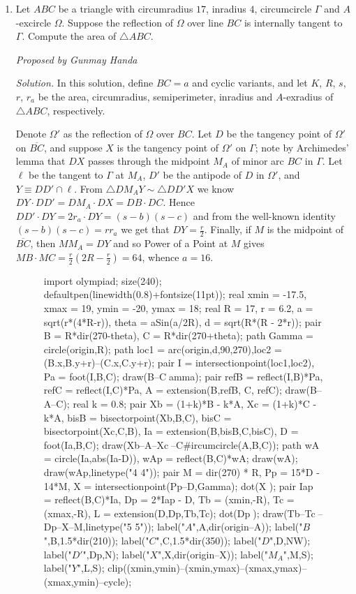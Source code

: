 \documentclass[10pt]{article}
\newcommand{\proposed}[1]
{
\vspace{5pt}
\noindent\textit{Proposed by #1}
}
\newcommand{\solution}
{
\vspace{5pt}
\noindent\textit{Solution.}\qquad
}
\begin{document}
\begin{enumerate}
\item Let $ABC$ be a triangle with circumradius $17$, inradius $4$, circumcircle $\Gamma$ and $A$-excircle $\Omega$. Suppose the reflection of $\Omega$ over line $BC$ is internally tangent to $\Gamma$.  Compute the area of $\triangle ABC$.

\proposed{Gunmay Handa}

\solution In this solution, define $BC=a$ and cyclic variants, and let $K$, $R$, $s$, $r$, $r_a$ be the area, circumradius, semiperimeter, inradius and $A$-exradius of $\triangle ABC$, respectively. 

\par Denote $\Omega'$ as the reflection of $\Omega$ over $BC$. Let $D$ be the tangency point of $\Omega'$ on $\overline{BC}$, and suppose $X$ is the tangency point of $\Omega'$ on $\Gamma$; note by Archimedes' lemma that $DX$ passes through the midpoint $M_A$ of minor arc $BC$ in $\Gamma$. Let $\ell$ be the tangent to $\Gamma$ at $M_A$, $D'$ be the antipode of $D$ in $\Omega'$, and $Y\equiv DD'\cap \ell$. From $\triangle DM_AY\sim \triangle DD'X$ we know $DY\cdot DD'=DM_A\cdot DX=DB\cdot DC$. Hence $DD'\cdot DY=2r_a\cdot DY=(s-b)(s-c)$ and from the well-known identity $(s-b)(s-c)=rr_a$ we get that $DY=\frac{r}{2}$. Finally, if $M$ is the midpoint of $\overline{BC}$, then $MM_A=DY$ and so Power of a Point at $M$ gives $MB\cdot MC=\frac{r}{2}\left(2R-\frac{r}{2}\right)=64$, whence $a=16$.

\begin{figure}[ht]
	\centering
	\begin{asy}
	import olympiad;
	size(240);
defaultpen(linewidth(0.8)+fontsize(11pt));
real xmin = -17.5, xmax = 19, ymin = -20, ymax = 18;
real R = 17, r = 6.2, a = sqrt(r*(4*R-r)), theta = aSin(a/2R), d = sqrt(R*(R - 2*r));
pair B = R*dir(270-theta), C = R*dir(270+theta);
path Gamma = circle(origin,R);
path loc1 = arc(origin,d,90,270),loc2 = (B.x,B.y+r)--(C.x,C.y+r);
pair I = intersectionpoint(loc1,loc2), Pa = foot(I,B,C);
draw(B--C^^Gamma);
pair refB = reflect(I,B)*Pa, refC = reflect(I,C)*Pa, A = extension(B,refB, C, refC);
draw(B--A--C);
real k = 0.8;
pair Xb = (1+k)*B - k*A, Xc = (1+k)*C - k*A, bisB = bisectorpoint(Xb,B,C), bisC = bisectorpoint(Xc,C,B), Ia = extension(B,bisB,C,bisC), D = foot(Ia,B,C);
draw(Xb--A--Xc^^B--C^^circumcircle(A,B,C));
path wA = circle(Ia,abs(Ia-D)), wAp = reflect(B,C)*wA;
draw(wA);
draw(wAp,linetype("4 4"));
pair M = dir(270) * R, Pp = 15*D - 14*M, X = intersectionpoint(Pp--D,Gamma);
dot(X^^M);
pair Iap = reflect(B,C)*Ia, Dp = 2*Iap - D, Tb = (xmin,-R), Tc = (xmax,-R), L = extension(D,Dp,Tb,Tc); 
dot(Dp^^D);
draw(Tb--Tc^^L--Dp--X--M,linetype("5 5"));
label("$A$",A,dir(origin--A));
label("$B$",B,1.5*dir(210));
label("$C$",C,1.5*dir(350));
label("$D$",D,NW);
label("$D'$",Dp,N);
label("$X$",X,dir(origin--X));
label("$M_A$",M,S);
label("$Y$",L,S);
clip((xmin,ymin)--(xmin,ymax)--(xmax,ymax)--(xmax,ymin)--cycle);
\end{asy}
\end{figure}


\end{enumerate}
\end{document}
